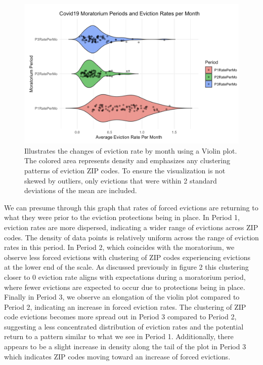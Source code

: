 \documentclass[man, 12pt, donotrepeattitle, floatsintext]{apa7} %
\begin{document}
\begin{figure}[H]
  \includegraphics[width=\linewidth]{figures/Forced_EvictionRates_figure6.png}
  \caption{Illustrates the changes of eviction rate by month using a Violin plot. The colored area represents density and emphasizes any clustering patterns of eviction ZIP codes. To ensure the visualization is not skewed by outliers, only evictions that were within 2 standard deviations of the mean are included.}
  \label{fig:EvictionsRatesPerMonth_4}
\end{figure}

We can presume through this graph that rates of forced evictions are returning to what they were prior to the eviction protections being in place. In Period 1, eviction rates are more dispersed, indicating a wider range of evictions across ZIP codes. The density of data points is relatively uniform across the range of eviction rates in this period. In Period 2, which coincides with the moratorium, we observe less forced evictions with clustering of ZIP codes experiencing evictions at the lower end of the scale. As discussed previously in figure 2 this clustering closer to 0 eviction rate aligns with expectations during a moratorium period, where fewer evictions are expected to occur due to protections being in place. Finally in Period 3, we observe an elongation of the violin plot compared to Period 2, indicating an increase in forced eviction rates. The clustering of ZIP code evictions becomes more spread out in Period 3 compared to Period 2, suggesting a less concentrated distribution of eviction rates and the potential return to a pattern similar to what we see in Period 1. Additionally, there appears to be a slight increase in density along the tail of the plot in Period 3 which indicates ZIP codes moving toward an increase of  forced evictions.
\end{document}
